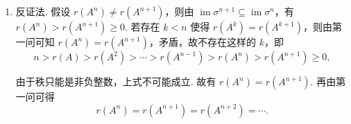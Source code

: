 \documentclass[12pt,fontset=fandol]{ctexart}
\begin{document}
\begin{solve}
\begin{enumerate}
                    因此，
                    \[
                        \operatorname{im} \sigma^m = \operatorname{im} \sigma^{m+1} = \operatorname{im} \sigma^{m+2} = \cdots.
                    \]

                    显然有
                    \[
                        r(A^m) = r(A^{m+1}) = r(A^{m+2}) = \cdots.
                    \]

                \item 反证法. 假设 $r(A^n) \neq r(A^{n+1})$，则由 $\operatorname{im} \sigma^{n+1} \subseteq \operatorname{im} \sigma^n$，有 $r(A^n) > r(A^{n+1}) \geqslant 0$.
                    若存在 $k < n$ 使得 $r(A^k) = r(A^{k+1})$，则由第一问可知 $r(A^n) = r(A^{n+1})$，矛盾，故不存在这样的 $k$，即
                    \[
                        n > r(A) > r(A^2) > \cdots > r(A^{n-1}) > r(A^n) > r(A^{n+1}) \geqslant 0,
                    \]

                    由于秩只能是非负整数，上式不可能成立. 故有 $r(A^n) = r(A^{n+1})$. 再由第一问可得
                    \[
                        r(A^n) = r(A^{n+1}) = r(A^{n+2}) = \cdots.
                    \]

            \end{enumerate}
\end{solve}
\end{document}

